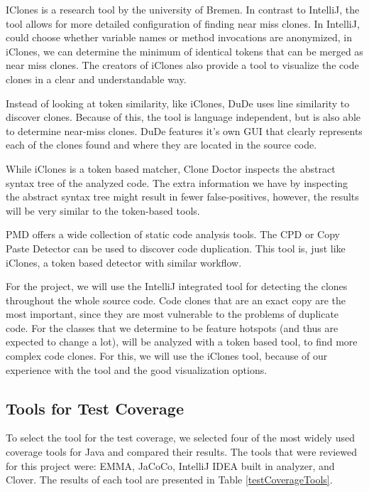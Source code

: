 \documentclass[]{article}
\begin{document}
IClones is a research tool by the university of Bremen. In contrast to IntelliJ, the tool allows for more detailed configuration of finding near miss clones. In IntelliJ, could choose whether variable names or method invocations are anonymized, in iClones, we can determine the minimum of identical tokens that can be merged as near miss clones. The creators of iClones also provide a tool to visualize the code clones in a clear and understandable way.

Instead of looking at token similarity, like iClones, DuDe uses line similarity to discover clones. Because of this, the tool is language independent, but is also able to determine near-miss clones. DuDe features it's own GUI that clearly represents each of the clones found and where they are located in the source code.

While iClones is a token based matcher, Clone Doctor inspects the abstract syntax tree of the analyzed code. The extra information we have by inspecting the abstract syntax tree might result in fewer false-positives, however, the results will be very similar to the token-based tools. 

PMD offers a wide collection of static code analysis tools. The CPD or Copy Paste Detector can be used to discover code duplication. This tool is, just like iClones, a token based detector with similar workflow. 

For the project, we will use the IntelliJ integrated tool for detecting the clones throughout the whole source code. Code clones that are an exact copy are the most important, since they are most vulnerable to the problems of duplicate code. For the classes that we determine to be feature hotspots (and thus are expected to change a lot), will be analyzed with a token based tool, to find more complex code clones. For this, we will use the iClones tool, because of our experience with the tool and the good visualization options.





\subsection{Tools for Test Coverage}
To select the tool for the test coverage, we selected four of the most widely used coverage tools for Java and compared their results. The tools that were reviewed for this project were: EMMA, JaCoCo, IntelliJ IDEA built in analyzer, and Clover. The results of each tool are presented in Table \ref{testCoverageTools}.
\end{document}
